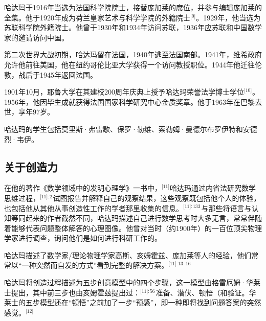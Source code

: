 哈达玛于1916年当选为法国科学院院士，接替庞加莱的席位，并参与编辑庞加莱的全集。他于1920年成为荷兰皇家艺术与科学学院的外籍院士\(^\text{[9]}\)。1929年，他当选为苏联科学院外籍院士。他曾于1930年和1934年访问苏联，1936年应苏联和中国数学家的邀请访问中国。

第二次世界大战初期，哈达玛留在法国，1940年逃至法国南部。1941年，维希政府允许他前往美国，他在纽约哥伦比亚大学获得一个访问教授职位。1944年他迁往伦敦，战后于1945年返回法国。

1901年10月，耶鲁大学在其建校200周年庆典上授予哈达玛荣誉法学博士学位\(^\text{[10]}\)。1956年，他因毕生成就获得法国国家科学研究中心金质奖章。他于1963年在巴黎去世，享年97岁。

哈达玛的学生包括莫里斯·弗雷歇、保罗·勒维、索勒姆·曼德尔布罗伊特和安德烈·韦伊。
\subsection{关于创造力}
在他的著作《数学领域中的发明心理学》一书中，\(^\text{[11]}\)哈达玛通过内省法研究数学思维过程，\(^\text{[11]: 2 }\)试图报告并解释自己的观察结果，这些观察既包括他个人的体验，也包括他从其他从事创造性工作的学者那里收集的信息。\(^\text{[11]: 133 }\)与那些将语言与认知等同起来的作者截然不同，哈达玛描述自己进行数学思考时大多无言，常常伴随着能够代表问题整体解答的心理图像。他曾对当时（约1900年）的一百位顶尖物理学家进行调查，询问他们是如何进行科研工作的。

哈达玛描述了数学家/理论物理学家高斯、亥姆霍兹、庞加莱等人的经验，他们常常以“一种突然而自发的方式”看到完整的解决方案。\(^\text{[11]: 13–16}\) 

哈达玛将创造过程描述为五步创意模型中的四个步骤，这一模型由格雷厄姆·华莱士提出，其中前三步也由亥姆霍兹提出过：\(^\text{[11]: 56}\) 准备、潜伏、顿悟（和验证。华莱士的五步模型还在“顿悟”之前加了一步“预感”，即一种即将找到问题答案的突然感觉。\(^\text{[12]}\)
